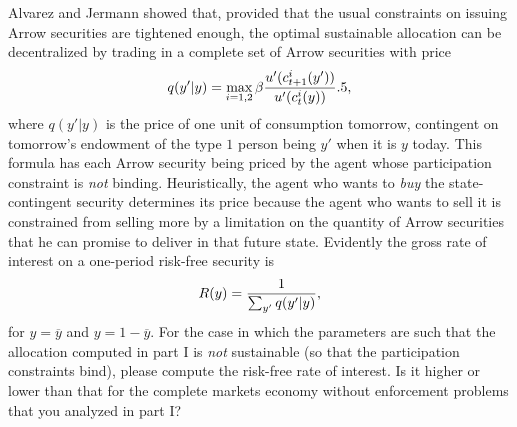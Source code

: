 \medskip
{} Alvarez and Jermann showed that, provided that
the usual constraints on issuing Arrow securities are tightened
enough,  the optimal sustainable allocation can be decentralized
by trading in a complete set of Arrow securities with price
$$ q(y' | y) = \max_{i=1,2} \beta {u'(c^i_{t+1}(y')) \over
                             u'(c^i_t(y)) }.5, $$
where $q(y'|y)$ is the price of one unit of consumption tomorrow,
contingent on tomorrow's endowment of the type $1$ person being
$y'$ when it is $y$ today. This formula has each Arrow security
being priced by the agent whose participation constraint is {\it
not\/} binding.  Heuristically, the agent who wants to {\it buy\/}
the state-contingent security determines its price because the agent who
wants to sell it is constrained from selling more by a limitation
on the quantity of Arrow securities that he can promise to deliver
in that future state. Evidently the gross rate of interest on a
one-period risk-free security is
$$ R(y)= {1 \over \sum_{y'} q(y'|y) } ,$$
for $y= \overline y$ and $y=1-\overline y$.
\medskip
 For the case in which the parameters are such that the
allocation computed in part I is {\it not\/} sustainable (so that
the participation constraints bind), please compute the risk-free
rate of interest.  Is it higher or lower than that for the
complete markets economy without enforcement problems that you
analyzed in part I?
